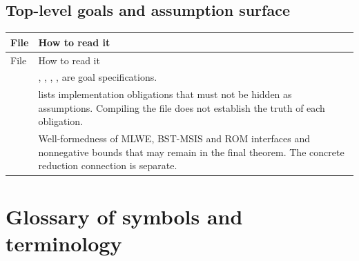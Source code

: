 \subsection{Top-level goals and assumption surface}

\begin{longtable}{L{58mm} L{89mm}}
\toprule
File & How to read it \\
\midrule
\endfirsthead
\toprule
File & How to read it \\
\midrule
\endhead
{} &
, , ,
,
 are goal specifications. \\
\allowbreak
{} &
 lists implementation obligations that must not be hidden as
assumptions. Compiling the file does not establish the truth of each obligation. \\
 &
Well-formedness of MLWE, BST-MSIS and ROM interfaces and nonnegative bounds
that may remain in the final theorem. The concrete reduction connection is separate. \\
\bottomrule
\end{longtable}

\section{Glossary of symbols and terminology}
\label{sec:glossary}

